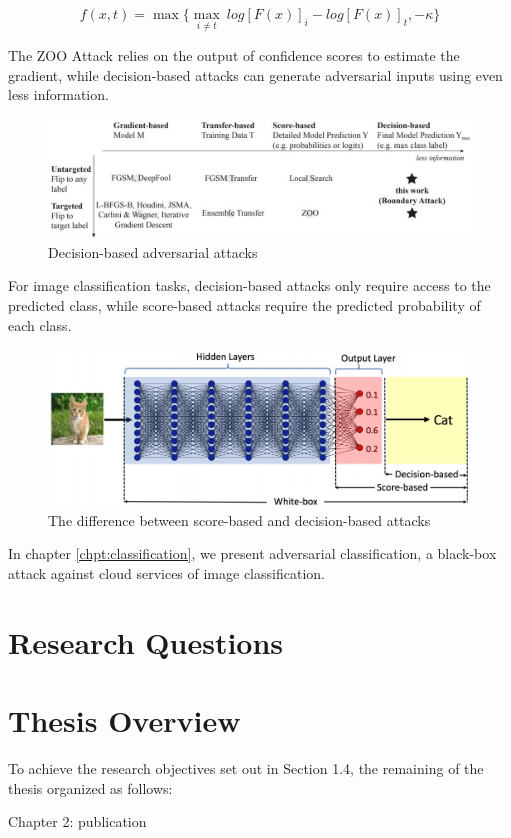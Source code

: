 $$f(x,t) = \max \{ {\underset{i \neq t}{\max}\ log[F(x)]_i - log[F(x)]_t, -\kappa } \}$$

The ZOO Attack relies on the output of confidence scores to estimate the gradient, while decision-based attacks can generate adversarial inputs using even less information.

\begin{figure}[H]
\centering
\includegraphics[scale=0.45]{figures/chapter_intro/query-efficient.jpg}
\caption{Decision-based adversarial attacks \citep{brendel2018decisionbased}}
\label{fig.query}
\end{figure}

For image classification tasks, decision-based attacks only require access to the predicted class, while score-based attacks require the predicted probability of each class.

\begin{figure}[H]
\centering
\includegraphics[scale=0.35]{figures/chapter_intro/score-decision.jpg}
\caption{The difference between score-based and decision-based attacks \citep{chen2020hopskipjumpattack}}
\label{fig.decision}
\end{figure}

In chapter \ref{chpt:classification}, we present adversarial classification, a black-box attack against cloud services of image classification.

\section{Research Questions}
\label{sec:research_question}

\section{Thesis Overview}

To achieve the research objectives set out in Section 1.4, the remaining of the thesis organized as follows:

Chapter 2: publication
